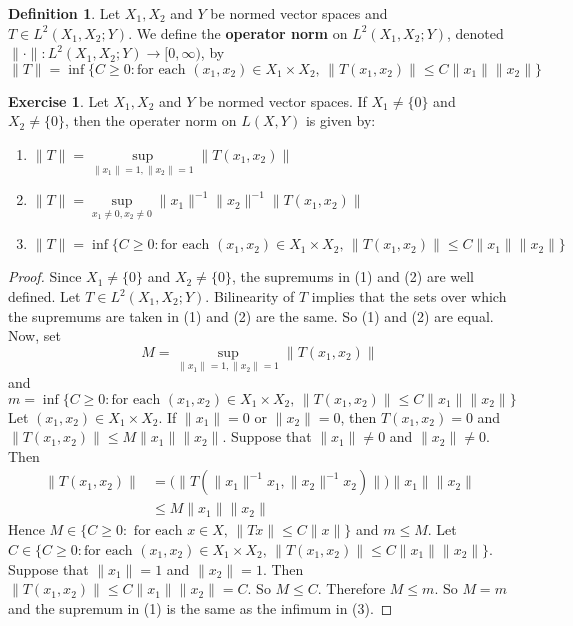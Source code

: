 \documentclass[12pt]{amsart}
\theoremstyle{definition}
\newtheorem{defn}[definition]{Definition}
\newtheorem{ex}[definition]{Exercise}
\newcommand{\lex}[1]{\label{ex:#1}}
\newcommand{\ld}[1]{\label{defn:#1}}
\begin{document}
	\begin{defn} \ld{43005}
	Let $X_1, X_2$ and $Y$ be normed vector spaces and $T \in L^2(X_1, X_2;Y)$. We define the \textbf{operator norm} on $L^2(X_1, X_2;Y)$, denoted $\|\cdot\|: L^2(X_1, X_2; Y) \rightarrow [0, \infty)$, by  $$\|T\| =  \inf \{C \geq 0: \text{for each } (x_1, x_2) \in X_1 \times X_2\text{, } \|T(x_1, x_2) \|\leq C\|x_1\|\|x_2\|\}$$
	\end{defn}
	
	\begin{ex} \lex{42006}
		Let $X_1, X_2$ and $Y$ be normed vector spaces. If $X_1 \neq \{0\}$ and $ X_2 \neq \{0\}$, then the operater norm on $L(X,Y)$ is given by: 
		\begin{enumerate}
			\item $\|T\| = \sup\limits_{\|x_1\|=1 ,\|x_2\| = 1 }\|T(x_1, x_2)\|$
			\item $\|T\| = \sup\limits_{x_1 \neq 0, x_2 \neq 0 } \|x_1\|^{-1} \|x_2\|^{-1}\|T(x_1, x_2)\|$
			\item $\|T\| = \inf \{C \geq 0: \text{for each } (x_1, x_2) \in X_1 \times X_2\text{, } \|T(x_1, x_2) \|\leq C\|x_1\|\|x_2\|\}$
		\end{enumerate}
	\end{ex}
	
	\begin{proof} Since $X_1 \neq \{0\}$ and $ X_2 \neq \{0\}$, the supremums in (1) and (2) are well defined. Let $T \in L^2(X_1, X_2; Y)$. Bilinearity of $T$ implies that the sets over which the supremums are taken in (1) and (2) are the same. So (1) and (2) are equal.\\
		Now, set 
		$$M = \sup\limits_{\|x_1\|=1 ,\|x_2\| = 1 }\|T(x_1, x_2)\|$$ 
		and 
		$$m = \inf \{C \geq 0: \text{for each } (x_1, x_2) \in X_1 \times X_2\text{, } \|T(x_1, x_2) \|\leq C\|x_1\|\|x_2\|\}$$ 
		Let $(x_1,x_2) \in X_1 \times X_2$. If $\|x_1 \|=0$ or $\|x_2 \|=0$, then $T(x_1, x_2) = 0$ and $\|T(x_1, x_2) \|\leq M \|x_1 \| \|x_2\|$. Suppose that $\|x_1 \| \neq 0$ and $ \|x_2\|\neq 0$. Then 
		\begin{align*}
			\|T(x_1, x_2)\|
			&= \bigg(\big\|T(\|x_1\|^{-1} x_1, \|x_2\|^{-1} x_2 )\big\|\bigg)\|x_1 \| \|x_2\|\\
			& \leq M \|x_1\| \|x_2\|
		\end{align*}
		Hence $M \in \{C \geq 0: \text{ for each }x \in X\text{, } \|Tx \|\leq C \|x \|\}$ and $m \leq M$.
		Let $C \in \{C \geq 0: \text{for each } (x_1, x_2) \in X_1 \times X_2\text{, } \|T(x_1, x_2) \|\leq C\|x_1\|\|x_2\|\}$. Suppose that $\|x_1 \|=1$ and $\|x_2\| = 1$. Then $\| T (x_1, x_2) \| \leq C \|x_1 \| \|x_2 \|= C$. So $M \leq C$. Therefore $M \leq m$. So $M=m$ and the supremum in (1) is the same as the infimum in (3). 
	\end{proof}
	
\end{document}
